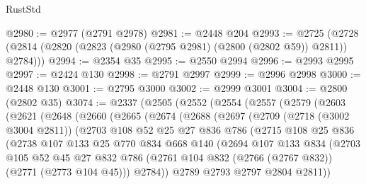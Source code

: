 \begin{lexlean}{RustStd}
\begin{coremodule}
@2980 := @2977 (@2791 @2978)
@2981 := @2448 @204
@2993 := @2725 (@2728 (@2814 (@2820 (@2823 (@2980 (@2795 @2981) (@2800 (@2802 @59)) @2811)) @2784)))
@2994 := @2354 @35
@2995 := @2550 @2994
@2996 := @2993 @2995
@2997 := @2424 @130
@2998 := @2791 @2997
@2999 := @2996 @2998
@3000 := @2448 @130
@3001 := @2795 @3000
@3002 := @2999 @3001
@3004 := @2800 (@2802 @35)
@3074 := @2337
    (@2505
      (@2552
        (@2554
          (@2557
            (@2579
              (@2603
                (@2621
                  (@2648
                    (@2660
                      (@2665
                        (@2674
                          (@2688
                            (@2697
                              (@2709
                                (@2718 (@3002 @3004 @2811))
                                (@2703
                                  @108
                                  @52
                                  @25
                                  @27
                                  @836
                                  @786
                                  (@2715
                                    @108
                                    @25
                                    @836
                                    (@2738
                                      @107
                                      @133
                                      @25
                                      @770
                                      @834
                                      @668
                                      @140
                                      (@2694
                                        @107
                                        @133
                                        @834
                                        (@2703
                                          @105
                                          @52
                                          @45
                                          @27
                                          @832
                                          @786
                                          (@2761
                                            @104
                                            @832
                                            (@2766 (@2767 @832))
                                            (@2771 (@2773 @104 @45)))
                                          @2784))
                                      @2789
                                      @2793
                                      @2797
                                      @2804
                                      @2811))

\end{coremodule}
\end{lexlean}
